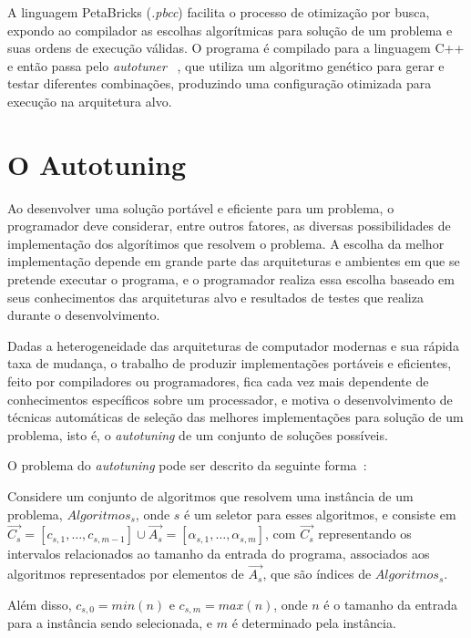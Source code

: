 \documentclass[a4paper, 11pt, twoside]{article}
\begin{document}
A linguagem PetaBricks (\emph{.pbcc}) facilita o processo de 
otimização por busca, expondo ao compilador as escolhas algorítmicas para 
solução de um problema e suas ordens de execução válidas. O programa é 
compilado para a linguagem C++ e então passa pelo \emph{autotuner} 
~\cite{ansel2011efficient}, que utiliza um algoritmo genético para gerar e 
testar diferentes combinações, produzindo uma configuração otimizada para 
execução na arquitetura alvo.

\section{O Autotuning}

Ao desenvolver uma solução portável e eficiente para um problema, o
programador deve considerar, entre outros fatores, as diversas possibilidades
de implementação dos algorítimos que resolvem o problema. A escolha da melhor
implementação depende em grande parte das arquiteturas e ambientes em que se 
pretende executar o programa, e o programador realiza essa escolha baseado
em seus conhecimentos das arquiteturas alvo e resultados de testes que realiza
durante o desenvolvimento. 

Dadas a heterogeneidade das arquiteturas de computador modernas e sua rápida 
taxa de mudança, o trabalho de produzir implementações portáveis e eficientes,
feito por compiladores ou programadores, fica cada vez mais dependente de
conhecimentos específicos sobre um processador, e motiva o desenvolvimento de
técnicas automáticas de seleção das melhores implementações para solução
de um problema, isto é, o \emph{autotuning} de um conjunto de 
soluções possíveis.

O problema do \emph{autotuning} pode ser descrito da seguinte forma~\cite{ansel2011efficient}:

Considere um conjunto de algoritmos que resolvem uma instância de um problema,
$Algoritmos_s$, onde $s$ é um seletor para esses algoritmos, e consiste em
$\overrightarrow{C_s} = [c_{s,1},\dots,c_{s,m-1}] \cup \overrightarrow{A_s} = [\alpha_{s,1},\dots,\alpha_{s,m}]$, 
com $\overrightarrow{C_s}$ representando os intervalos relacionados ao tamanho da
entrada do programa, associados aos algoritmos representados por elementos de
$\overrightarrow{A_s}$, que são índices de $Algoritmos_s$.

Além disso, $c_{s,0} = min(n)$ e $c_{s,m} = max(n)$,
onde $n$ é o tamanho da entrada para a instância sendo selecionada, e $m$ 
é determinado pela instância.
\end{document}
